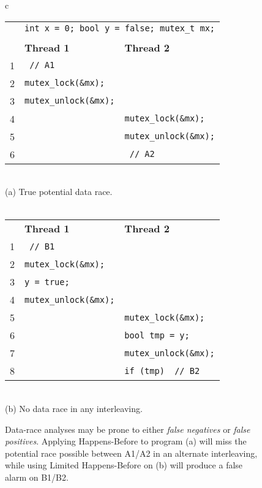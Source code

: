 \begin{figure}[t]
        \small
	\begin{center}
\begin{tabular}{c}
\begin{tabular}{rll}
        & \multicolumn{2}{c}{\texttt{int x = 0; bool y = false; mutex\_t mx;}} \\
        \\
        & {\bf Thread 1} & {\bf Thread 2} \\
        1 & \texttt{\hilight{brickred}{x++;}~// A1} & \\
        2 & \texttt{mutex\_lock(\&mx);} & \\
        3 & \texttt{mutex\_unlock(\&mx);} & \\
        4 & & \texttt{mutex\_lock(\&mx);} \\
        5 & & \texttt{mutex\_unlock(\&mx);} \\
        6 & & \texttt{\hilight{brickred}{x++;}~// A2} \\
\end{tabular}
\\
	{\normalsize (a) True potential data race.}
\\
\\
\begin{tabular}{rll}
        & {\bf Thread 1} & {\bf Thread 2} \\
        1 & \texttt{\hilight{brickred}{x++;}~// B1} & \\
        2 & \texttt{mutex\_lock(\&mx);} & \\
        3 & \texttt{y = true;} & \\
        4 & \texttt{mutex\_unlock(\&mx);} & \\
        5 & & \texttt{mutex\_lock(\&mx);} \\
        6 & & \texttt{bool tmp = y;} \\
        7 & & \texttt{mutex\_unlock(\&mx);} \\
        8 & & \texttt{if (tmp) \hilight{brickred}{x++;}~// B2} \\
\end{tabular}
\\
{\normalsize (b) No data race in any interleaving.}
\end{tabular}
	\end{center}
\caption{{Data-race analyses may be prone to either {\em false negatives} or {\em false positives}.
Applying Happens-Before to program (a) will miss the potential race possible between A1/A2 in an alternate interleaving,
while using Limited Happens-Before on (b) will produce a false alarm on B1/B2.}}
\label{fig:hb-example}
\end{figure}

